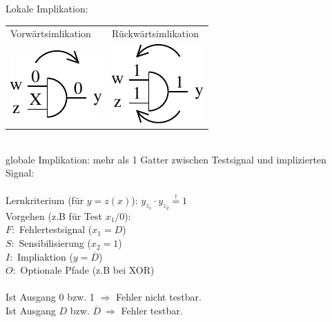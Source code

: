 \documentclass[6pt,a4paper]{scrartcl}
\newcommand{\ol}[1]{\ensuremath{\overline{#1}}}									%
\newcommand{\Ra}[0]{\ensuremath{\Rightarrow}}									%
\begin{document}
\begin{multicols}{3}
	Lokale Implikation:
	\begin{tabular}{ll}
	Vorwärtsimlikation & Rückwärtsimlikation\\
	\includegraphics[scale = 0.8]{img/ds/vorimplikation.pdf} & \includegraphics[scale = 0.7]{img/ds/backimplication.pdf}\\%
	\end{tabular}
	\\
	globale Implikation: mehr als 1 Gatter zwischen Testsignal und implizierten Signal:\\
	\boxed{ A \Ra B \ \Leftrightarrow\  \ol B \Ra \ol A}\\
	Lernkriterium (für $y=z(x)$): $y_{z_1} \cdot y_{z_2} \stackrel{!}= 1$\\

	Vorgehen (z.B für Test $x_1/0$):\\
	$F:$ Fehlertestsignal ($x_1 = D$)\\
	$S:$ Sensibilisierung ($x_2 = 1$)\\
	$I:$ Impliaktion ($y = \ol D$)\\
	$O:$ Optionale Pfade (z.B bei XOR)\\
	\\
	Ist Ausgang $0$ bzw. 1 $\Ra$ Fehler nicht testbar.\\
	Ist Ausgang $D$ bzw. $\ol D\ \Ra$ Fehler testbar.\\


\end{multicols}
\end{document}
